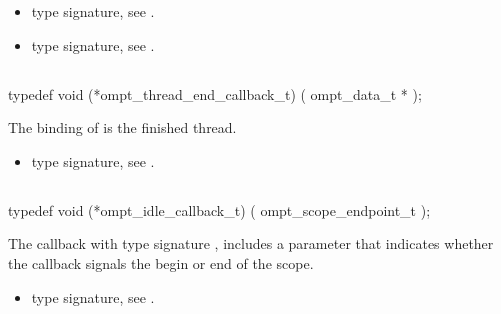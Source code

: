 \crossreferences
\begin{itemize}
\item {} type signature, see
.
\item {} type signature, see
.
\end{itemize}



\subsection{}
\label{subsec:ompt_thread_end_callback_t}
\format
\begin{boxedcode}
typedef void (*ompt\_thread\_end\_callback\_t) (
  ompt\_data\_t *
);
\end{boxedcode}
\descr
The binding of  is the finished thread.

\crossreferences
\begin{itemize}
\item {} type signature, see
.
\end{itemize}



\subsection{}
\label{subsec:ompt_idle_callback_t}
\format
\begin{boxedcode}
typedef void (*ompt\_idle\_callback\_t) (
  ompt\_scope\_endpoint\_t 
);
\end{boxedcode}
\descr
The callback with type signature ,
includes a parameter 
that indicates whether the callback signals the begin or end of the scope.

\crossreferences
\begin{itemize}
\item {} type signature, see
.
\end{itemize}



